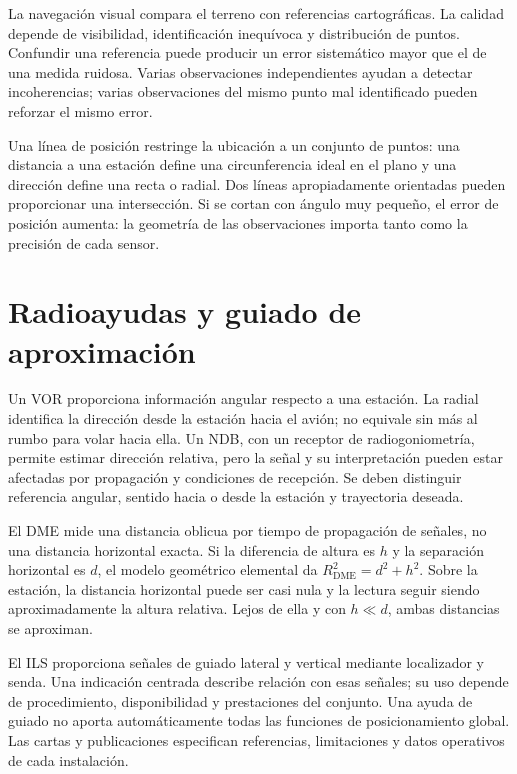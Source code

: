 La navegación visual compara el terreno con referencias cartográficas. La calidad depende de visibilidad, identificación inequívoca y distribución de puntos. Confundir una referencia puede producir un error sistemático mayor que el de una medida ruidosa. Varias observaciones independientes ayudan a detectar incoherencias; varias observaciones del mismo punto mal identificado pueden reforzar el mismo error.

Una línea de posición restringe la ubicación a un conjunto de puntos: una distancia a una estación define una circunferencia ideal en el plano y una dirección define una recta o radial. Dos líneas apropiadamente orientadas pueden proporcionar una intersección. Si se cortan con ángulo muy pequeño, el error de posición aumenta: la geometría de las observaciones importa tanto como la precisión de cada sensor.

\section{Radioayudas y guiado de aproximación}
Un VOR proporciona información angular respecto a una estación. La radial identifica la dirección desde la estación hacia el avión; no equivale sin más al rumbo para volar hacia ella. Un NDB, con un receptor de radiogoniometría, permite estimar dirección relativa, pero la señal y su interpretación pueden estar afectadas por propagación y condiciones de recepción. Se deben distinguir referencia angular, sentido hacia o desde la estación y trayectoria deseada.

El DME mide una distancia oblicua por tiempo de propagación de señales, no una distancia horizontal exacta. Si la diferencia de altura es $h$ y la separación horizontal es $d$, el modelo geométrico elemental da $R_{\mathrm{DME}}^2=d^2+h^2$. Sobre la estación, la distancia horizontal puede ser casi nula y la lectura seguir siendo aproximadamente la altura relativa. Lejos de ella y con $h\ll d$, ambas distancias se aproximan.

El ILS proporciona señales de guiado lateral y vertical mediante localizador y senda. Una indicación centrada describe relación con esas señales; su uso depende de procedimiento, disponibilidad y prestaciones del conjunto. Una ayuda de guiado no aporta automáticamente todas las funciones de posicionamiento global. Las cartas y publicaciones especifican referencias, limitaciones y datos operativos de cada instalación.

